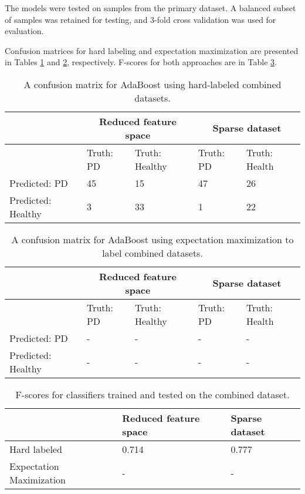 \documentclass[draftcopy]{srpaper}
\begin{document}
The models were tested on samples from
the primary dataset. A balanced subset of samples was retained for
testing, and 3-fold cross validation was used for evaluation. 

Confusion matrices for hard labeling and expectation maximization are presented in Tables
\ref{table:combinedHard} and \ref{table:combinedEM},
respectively. F-scores for both approaches are in Table \ref{table:combinedFScores}. 

\begin{table}
\begin{center}
\begin{tabular}{|l|l|l|l|l|}
\hline
& \multicolumn{2}{|c|}{Reduced feature space} &
\multicolumn{2}{|c|}{Sparse dataset} \\ \hline
 & Truth: PD & Truth: Healthy & Truth: PD & Truth: Health\\ \hline
Predicted: PD & 45 & 15 & 47 & 26 \\ \hline
Predicted: Healthy &  3 & 33 & 1 & 22 \\ \hline

\end{tabular}
\end{center}
\caption[Confusion Matrix for AdaBoost]{A confusion matrix for
  AdaBoost using hard-labeled combined datasets.}
\label{table:combinedHard}
\end{table}

\begin{table}
\begin{center}
\begin{tabular}{|l|l|l|l|l|}
\hline
& \multicolumn{2}{|c|}{Reduced feature space} &
\multicolumn{2}{|c|}{Sparse dataset} \\ \hline
 & Truth: PD & Truth: Healthy & Truth: PD & Truth: Health\\ \hline
Predicted: PD & - & - & - & - \\ \hline
Predicted: Healthy &  - & - & - & - \\ \hline

\end{tabular}
\end{center}
\caption[Confusion Matrix for AdaBoost]{A confusion matrix for
  AdaBoost using expectation maximization to label combined datasets.}
\label{table:combinedEM}
\end{table}

\begin{table}
\begin{center}
\begin{tabular}{|l|l|l|}
\hline

& Reduced feature space & Sparse dataset \\ \hline
Hard labeled & 0.714 & 0.777 \\ \hline
Expectation Maximization & - & - \\ \hline

\end{tabular}
\end{center}
\caption[Performance on Combined Dataset]{F-scores for classifiers trained and tested on the combined dataset.}
\label{table:combinedFScores}
\end{table}
\end{document}
